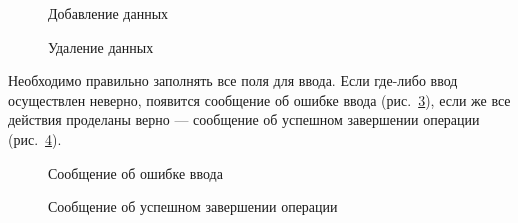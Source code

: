 \begin{figure}[h!]
\caption{Добавление данных}
\label{admin_insert:admin_insert}
\end{figure}

\begin{figure}[h!]
\caption{Удаление данных}
\label{admin_delete:admin_delete}
\end{figure}

Необходимо правильно заполнять все поля для ввода. Если где-либо ввод осуществлен неверно, появится сообщение об ошибке ввода (рис.~\ref{err_win:err_win}), если же все действия проделаны верно --- сообщение об успешном завершении операции (рис.~\ref{suc_win:suc_win}).

\begin{figure}[h!]
\caption{Сообщение об ошибке ввода}
\label{err_win:err_win}
\end{figure}

\begin{figure}[h!]
\caption{Сообщение об успешном завершении операции}
\label{suc_win:suc_win}
\end{figure}
